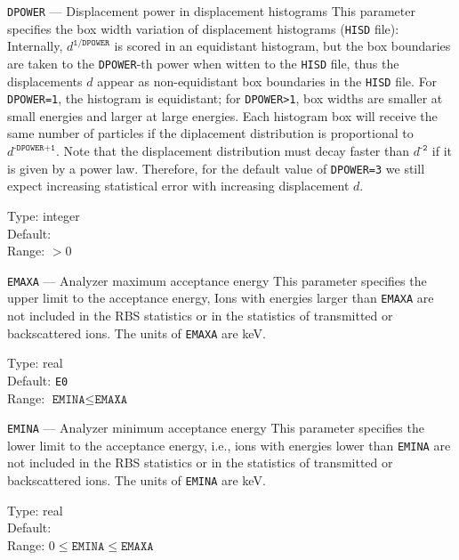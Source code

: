 \begin{keydescription}{\texttt{DPOWER} --- Displacement power in displacement histograms}
%
  This parameter specifies the box width variation of displacement histograms (\texttt{HISD} 
  file): Internally, $d^\texttt{1/DPOWER}$ is scored in an equidistant histogram, but the box 
  boundaries are taken to the \texttt{DPOWER}-th power when witten to the \texttt{HISD} file, 
  thus the displacements $d$ appear as non-equidistant box boundaries in the \texttt{HISD} 
  file. For \texttt{DPOWER=1}, the histogram is equidistant; for \texttt{DPOWER>1}, box widths 
  are smaller at small energies and larger at large energies. Each histogram box will receive 
  the same number of particles if the diplacement distribution is proportional to 
  $d^\texttt{-DPOWER+1}$. Note that the displacement distribution must decay faster than 
  $d^\texttt{-2}$ if it is given by a power law. Therefore, for the default value of 
  \texttt{DPOWER=3} we still expect increasing statistical error with increasing displacement 
  $d$.
  \begin{keytab}
    Type:    \> integer \\
    Default:   \\
    Range:   \> $>0$
  \end{keytab}
\end{keydescription}

\begin{keydescription}{\texttt{EMAXA} --- Analyzer maximum acceptance energy}
%
  This parameter specifies the upper limit to the acceptance energy, Ions with energies larger 
  than \texttt{EMAXA} are not included in the RBS statistics or in the statistics of 
  transmitted or backscattered ions. The units of \texttt{EMAXA} are keV.
  \begin{keytab}
    Type:    \> real \\
    Default: \> \texttt{E0}  \\
    Range:   \> $\texttt{EMINA} \le \texttt{EMAXA}$
  \end{keytab}
\end{keydescription}

\begin{keydescription}{\texttt{EMINA} --- Analyzer minimum acceptance energy}
%
  This parameter specifies the lower limit to the acceptance energy, i.e., ions with energies 
  lower than \texttt{EMINA} are not included in the RBS statistics or in the statistics of 
  transmitted or backscattered ions. The units of \texttt{EMINA} are keV.
  \begin{keytab}
    Type:    \> real \\
    Default:   \\
    Range:   \> $0 \le \texttt{EMINA} \le \texttt{EMAXA}$
  \end{keytab}
\end{keydescription}

